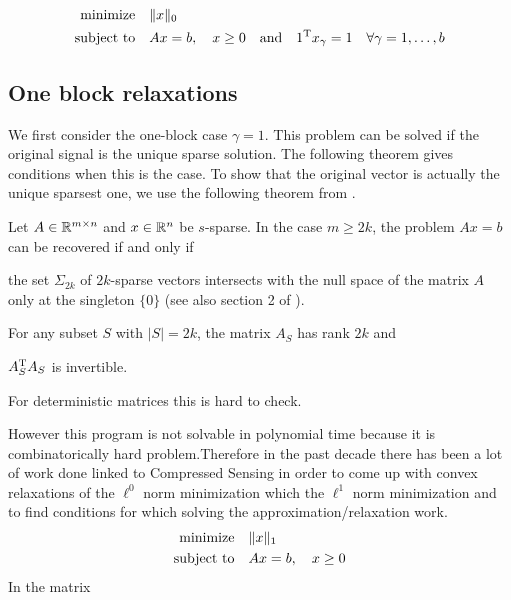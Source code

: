 \documentclass{article} %
\begin{document}
\begin{equation}\label{l0-minimization}
  \begin{split}
    \text{minimize} &\quad \lVert x\rVert_0\\
    \text{subject to} &\quad Ax = b,\quad x\geq 0\quad \text{and}\quad 1^{\rm T} x_{\gamma} = 1\quad \forall \gamma=1,\dots, b
  \end{split}
\end{equation}

\subsection{One block relaxations}
We first consider the one-block case $\gamma = 1$. 
This problem can be solved if the original signal is the unique sparse solution. The following theorem gives conditions when this is the case. To show that the original vector is actually the unique sparsest one, we use the following theorem from \cite{Dahmen_CS}.
\begin{theorem}
\label{thm:l0unique}
Let $A \in \mathbb{R}^{m\times n}$ and $x\in\mathbb{R}^n$ be $s$-sparse. In the case
$m\geq 2k$, the problem $Ax = b$ can be recovered if and only if
\begin{compactenum}[(a)]
\item the set $\Sigma_{2k}$ of $2k$-sparse vectors intersects with the null space of the matrix $A$ only at the singleton $\{0\}$ (see also section 2 of \cite{Dahmen_CS}).
\item For any subset $S$ with $|S| = 2k$, the matrix $A_S$ has rank $2k$ and
\item $A_S^{\rm T} A_S$ is invertible.
\end{compactenum}
\end{theorem}
For deterministic matrices this is hard to check.

However this program is not solvable in polynomial time because it is combinatorically hard problem.Therefore in the past decade there has been a lot of work done linked to Compressed Sensing in order to come up with convex relaxations of the $\ell^0$ norm minimization which the $\ell^1$ norm minimization and to find conditions for which solving the approximation/relaxation work.
\begin{equation}\label{l1-minimization}
  \begin{split}
    \text{minimize} &\quad \lVert x\rVert_1\\
    \text{subject to} &\quad Ax = b,\quad x\geq 0
  \end{split}
\end{equation}
In the matrix
\end{document}
